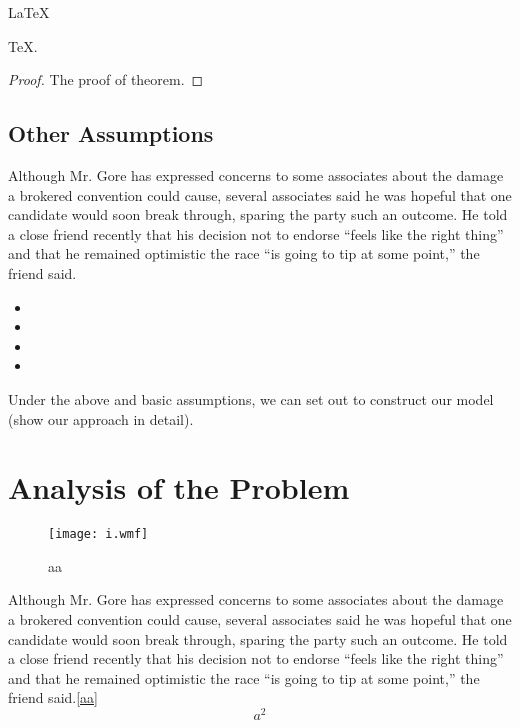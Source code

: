     \begin{Theorem} \label{thm:latex}
    \LaTeX
    \end{Theorem}
    \begin{Lemma} \label{thm:tex}
    \TeX .
    \end{Lemma}
    \begin{proof}
    The proof of theorem.
    \end{proof}






\subsection{Other Assumptions}
Although Mr. Gore has expressed concerns to some associates about
the damage a brokered convention could cause, several associates
said he was hopeful that one candidate would soon break through,
sparing the party such an outcome. He told a close friend recently
that his decision not to endorse ``feels like the right thing''
and that he remained optimistic the race ``is going to tip at some
point,'' the friend said.
\begin{itemize}
\item
\item
\item
\item
\end{itemize}

 Under the above and basic assumptions, we can set out
to construct our model (show our approach in detail).
\section{Analysis of the Problem }
\begin{figure}[h]
\small
\centering
\texttt{[image: i.wmf]}
\caption{aa} \label{fig:aa}
\end{figure}

Although Mr. Gore has expressed concerns to some associates about
the damage a brokered convention could cause, several associates
said he was hopeful that one candidate would soon break through,
sparing the party such an outcome. He told a close friend recently
that his decision not to endorse ``feels like the right thing''
and that he remained optimistic the race ``is going to tip at some
point,'' the friend said.\eqref{aa}
\begin{equation}
  a^2 \label{aa}
\end{equation}


